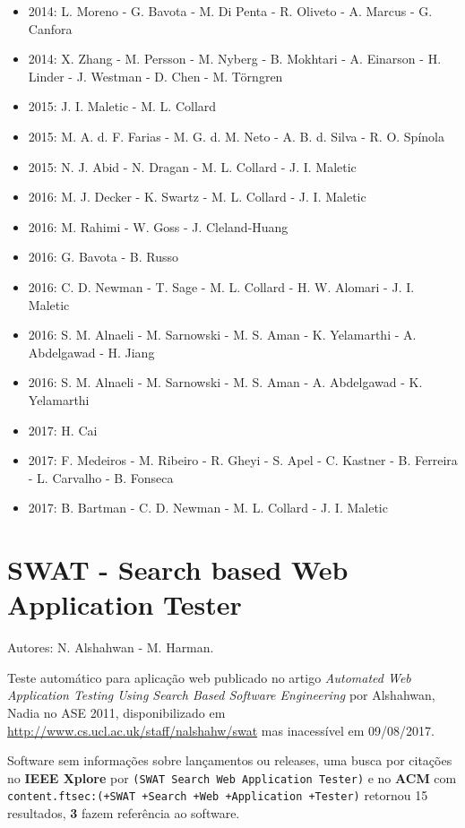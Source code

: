 \begin{itemize}
\item 2014: L. Moreno - G. Bavota - M. Di Penta - R. Oliveto - A. Marcus - G. Canfora
\item 2014: X. Zhang - M. Persson - M. Nyberg - B. Mokhtari - A. Einarson - H. Linder - J. Westman - D. Chen - M. Törngren
\item 2015: J. I. Maletic - M. L. Collard
\item 2015: M. A. d. F. Farias - M. G. d. M. Neto - A. B. d. Silva - R. O. Spínola
\item 2015: N. J. Abid - N. Dragan - M. L. Collard - J. I. Maletic
\item 2016: M. J. Decker - K. Swartz - M. L. Collard - J. I. Maletic
\item 2016: M. Rahimi - W. Goss - J. Cleland-Huang
\item 2016: G. Bavota - B. Russo
\item 2016: C. D. Newman - T. Sage - M. L. Collard - H. W. Alomari - J. I. Maletic
\item 2016: S. M. Alnaeli - M. Sarnowski - M. S. Aman - K. Yelamarthi - A. Abdelgawad - H. Jiang
\item 2016: S. M. Alnaeli - M. Sarnowski - M. S. Aman - A. Abdelgawad - K. Yelamarthi
\item 2017: H. Cai
\item 2017: F. Medeiros - M. Ribeiro - R. Gheyi - S. Apel - C. Kastner - B. Ferreira - L. Carvalho - B. Fonseca
\item 2017: B. Bartman - C. D. Newman - M. L. Collard - J. I. Maletic
\end{itemize}

\section{SWAT - Search based Web Application Tester}

Autores:
N. Alshahwan - M. Harman.

Teste automático para aplicação web
publicado no artigo {\it Automated Web Application Testing Using Search Based Software Engineering}
por Alshahwan, Nadia
no ASE 2011,
disponibilizado em \url{http://www.cs.ucl.ac.uk/staff/nalshahw/swat}
mas inacessível em 09/08/2017.

Software sem informações sobre lançamentos ou releases,
uma busca por citações no {\bf IEEE Xplore} por
\texttt{(SWAT Search Web Application Tester)}
e no {\bf ACM} com
\texttt{content.ftsec:(+SWAT +Search +Web +Application +Tester)}
retornou
15 resultados,
{\bf 3} fazem referência ao software.


